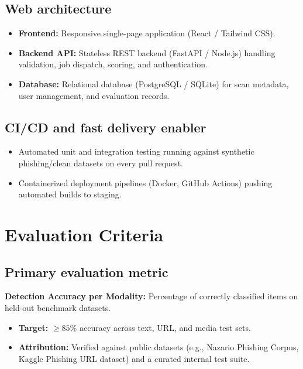 \documentclass[11pt,a4paper]{article}
\newcommand{\BvrHint}[1]{%
  {\normalfont\normalsize\itshape\hfill #1}}
\begin{document}
\subsection{Web architecture %
\BvrHint{}}
\begin{itemize}[leftmargin=0.7cm]
    \item \textbf{Frontend:} Responsive single-page application (React / Tailwind CSS).
    \item \textbf{Backend API:} Stateless REST backend (FastAPI / Node.js) handling validation, job dispatch, scoring, and authentication.
    \item \textbf{Database:} Relational database (PostgreSQL / SQLite) for scan metadata, user management, and evaluation records.
\end{itemize}

\subsection{CI/CD and fast delivery enabler}
\begin{itemize}[leftmargin=0.7cm]
    \item Automated unit and integration testing running against synthetic phishing/clean datasets on every pull request.
    \item Containerized deployment pipelines (Docker, GitHub Actions) pushing automated builds to staging.
\end{itemize}

\section{Evaluation Criteria %
\BvrHint{}}

\subsection{Primary evaluation metric}
\textbf{Detection Accuracy per Modality:} Percentage of correctly classified items on held-out benchmark datasets.
\begin{itemize}[leftmargin=0.7cm]
    \item \textbf{Target:} $\geq 85\%$ accuracy across text, URL, and media test sets.
    \item \textbf{Attribution:} Verified against public datasets (e.g., Nazario Phishing Corpus, Kaggle Phishing URL dataset) and a curated internal test suite.
\end{itemize}
\end{document}
